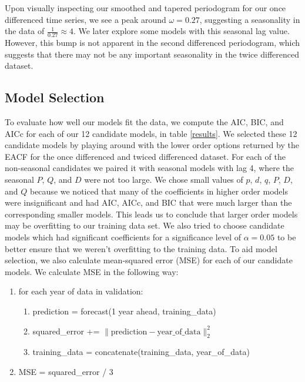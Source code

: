\documentclass[11pt]{paper}
\begin{document}
Upon visually inspecting our smoothed and tapered periodogram for our once differenced time series, we see a peak around $\omega = 0.27$, suggesting a seasonality in the data of $\frac{1}{0.27} \approx 4$. We later explore some models with this seasonal lag value. However, this bump is not apparent in the second differenced periodogram, which suggests that there may not be any important seasonality in the twice differenced dataset.

\subsection{Model Selection}
To evaluate how well our models fit the data, we compute the AIC, BIC, and AICc for each of our 12 candidate models, in table \ref{results}. We selected these 12 candidate models by playing around with the lower order options returned by the EACF for the once differenced and twiced differenced dataset. For each of the non-seasonal candidates we paired it with seasonal models with lag 4, where the seasonal $P$, $Q$, and $D$ were not too large. We chose small values of $p$, $d$, $q$, $P$, $D$, and $Q$ because we noticed that many of the coefficients in higher order models were insignificant and had AIC, AICc, and BIC that were much larger than the corresponding smaller models. This leads us to conclude that larger order models may be overfitting to our training data set. We also tried to choose candidate models which had significant coefficients for a significance level of $\alpha = 0.05$ to be better ensure that we weren't overfitting to the training data. To aid model selection, we also calculate mean-squared error (MSE) for each of our candidate models. We calculate MSE in the following way:

\begin{algo}
\begin{enumerate}
    \item for each year of data in validation:
    \begin{enumerate}
        \item prediction = forecast(1 year ahead, training_data)
        \item squared_error += $\| \text{prediction} - \text{year_of_data}\|_2^2$
        \item training_data = concatenate(training_data, year_of_data)
    \end{enumerate}
    \item MSE = squared_error / 3
\end{enumerate}
\end{algo}
\end{document}
